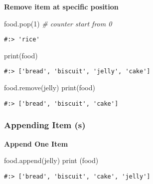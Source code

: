 \documentclass[
]{book}
\newenvironment{Shaded}{\begin{snugshade}}{\end{snugshade}}
\newcommand{\BuiltInTok}[1]{#1}
\newcommand{\CommentTok}[1]{\textcolor[rgb]{0.37,0.37,0.37}{\textit{#1}}}
\newcommand{\DecValTok}[1]{\textcolor[rgb]{0.06,0.06,0.06}{#1}}
\newcommand{\NormalTok}[1]{#1}
\newcommand{\StringTok}[1]{\textcolor[rgb]{0.5,0.5,0.5}{#1}}
\begin{document}
\textbf{Remove item at specific position}

\begin{Shaded}
\begin{Highlighting}[]
\NormalTok{food.pop(}\DecValTok{1}\NormalTok{)  }\CommentTok{\# counter start from 0}
\end{Highlighting}
\end{Shaded}

\begin{verbatim}
#:> 'rice'
\end{verbatim}

\begin{Shaded}
\begin{Highlighting}[]
\BuiltInTok{print}\NormalTok{(food)}
\end{Highlighting}
\end{Shaded}

\begin{verbatim}
#:> ['bread', 'biscuit', 'jelly', 'cake']
\end{verbatim}

\begin{Shaded}
\begin{Highlighting}[]
\NormalTok{food.remove(}\StringTok{\textquotesingle{}jelly\textquotesingle{}}\NormalTok{)}
\BuiltInTok{print}\NormalTok{(food)}
\end{Highlighting}
\end{Shaded}

\begin{verbatim}
#:> ['bread', 'biscuit', 'cake']
\end{verbatim}

\hypertarget{appending-item-s}{%
\subsubsection{Appending Item (s)}\label{appending-item-s}}

\textbf{Append One Item}

\begin{Shaded}
\begin{Highlighting}[]
\NormalTok{food.append(}\StringTok{\textquotesingle{}jelly\textquotesingle{}}\NormalTok{)}
\BuiltInTok{print}\NormalTok{ (food)}
\end{Highlighting}
\end{Shaded}

\begin{verbatim}
#:> ['bread', 'biscuit', 'cake', 'jelly']
\end{verbatim}
\end{document}
